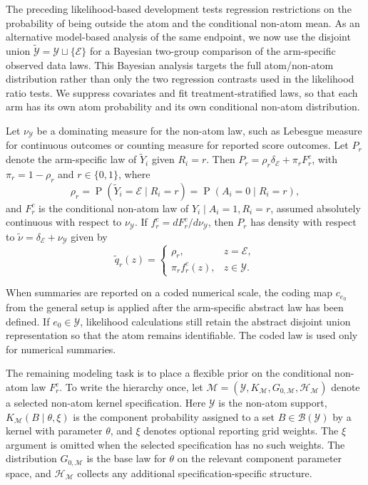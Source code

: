 \documentclass[11pt]{article}
\DeclareMathOperator{\Prob}{P}
\begin{document}
The preceding likelihood-based development tests regression restrictions on
the probability of being outside the atom and the conditional non-atom mean. As an alternative model-based analysis of the same endpoint, we now use the disjoint union
$\widetilde{\mathcal{Y}}=\mathcal{Y}\sqcup\{\mathcal{E}\}$ for a Bayesian
two-group comparison of the arm-specific observed data laws. This Bayesian
analysis targets the full atom/non-atom distribution rather than only the two
regression contrasts used in the likelihood ratio tests. We suppress covariates
and fit treatment-stratified laws, so that each arm has its own atom probability
and its own conditional non-atom distribution.

Let $\nu_{\mathcal{Y}}$ be a dominating measure for the non-atom law, such as
Lebesgue measure for continuous outcomes or counting measure for reported score
outcomes. Let $P_r$ denote the arm-specific law of $\widetilde{Y}_i$ given
$R_i=r$. Then $P_r = \rho_r \delta_{\mathcal{E}} + \pi_r F_r^c$, with
$\pi_r=1-\rho_r$ and $r\in\{0,1\}$,
where
\[
  \rho_r=\Prob(\widetilde{Y}_i=\mathcal{E}\mid R_i=r)=\Prob(A_i=0\mid R_i=r),
\]
and $F_r^c$ is the conditional non-atom law of
$Y_i\mid A_i=1,R_i=r$, assumed absolutely continuous with respect to
$\nu_{\mathcal{Y}}$. If $f_r^c=dF_r^c/d\nu_{\mathcal{Y}}$, then $P_r$ has density
with respect to $\widetilde{\nu}=\delta_{\mathcal{E}}+\nu_{\mathcal{Y}}$ given by
\[
  \widetilde{q}_r(z)
  =
  \begin{cases}
    \rho_r, & z=\mathcal{E},\\
    \pi_r f_r^c(z), & z\in\mathcal{Y}.
  \end{cases}
\]

When summaries are reported on a coded numerical scale, the coding map
$c_{e_0}$ from the general setup is applied after the arm-specific abstract law
has been defined. If $e_0\in\mathcal{Y}$, likelihood calculations still retain
the abstract disjoint union representation so that the atom remains identifiable.
The coded law is used only for numerical summaries.


The remaining modeling task is to place a flexible prior on the conditional
non-atom law $F_r^c$. To write the hierarchy once, let
$\mathcal{M}=(\mathcal{Y},K_{\mathcal{M}},G_{0,\mathcal{M}},\mathcal{H}_{\mathcal{M}})$
denote a selected non-atom kernel specification. Here $\mathcal{Y}$ is the non-atom support,
$K_{\mathcal{M}}(B\mid\theta,\xi)$ is the component probability assigned to a
set $B\in\mathcal{B}(\mathcal{Y})$ by a kernel with parameter
$\theta$, and $\xi$ denotes optional reporting grid weights. The $\xi$ argument is omitted when the selected
specification has no such weights. The distribution $G_{0,\mathcal{M}}$ is the base law
for $\theta$ on the relevant component parameter space, and
$\mathcal{H}_{\mathcal{M}}$ collects any additional specification-specific structure.
\end{document}
